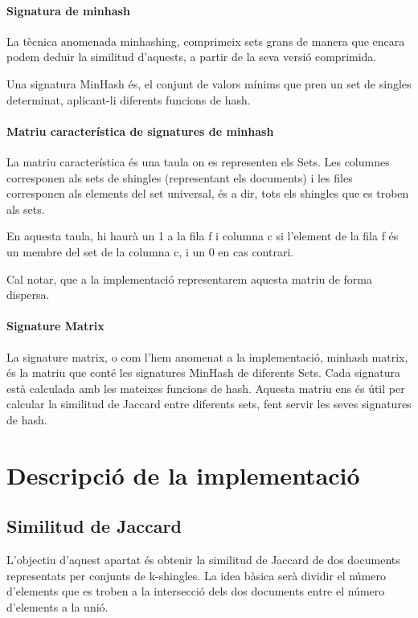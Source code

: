 \documentclass[a4paper, titlepage, 12pt]{report}
\begin{document}
\subsubsection{Signatura de minhash}
La tècnica anomenada minhashing, comprimeix sets grans de manera que encara podem deduir la similitud d’aquests, a partir de la seva versió comprimida.

Una signatura MinHash és, el conjunt de valors mínims que pren un set de singles determinat, aplicant-li diferents funcions de hash.

\subsubsection{Matriu característica de signatures de minhash}
La matriu característica és una taula on es representen els Sets. Les columnes corresponen als sets de shingles (representant els documents) i les files corresponen als elements del set universal, és a dir, tots els shingles que es troben als sets.

En aquesta taula, hi haurà un 1 a la fila f i columna c si l’element de la fila f és un membre del set de la columna c, i un 0 en cas contrari.

Cal notar, que a la implementació representarem aquesta matriu de forma dispersa.

\subsubsection{Signature Matrix}
La signature matrix, o com l’hem anomenat a la implementació, minhash matrix, és la matriu que conté les signatures MinHash de diferents Sets. Cada signatura està calculada amb les mateixes funcions de hash. Aquesta matriu ens és útil per calcular la similitud de Jaccard entre diferents sets, fent servir les seves signatures de hash.




\chapter{Descripció de la implementació}
\section{Similitud de Jaccard}
L’objectiu d’aquest apartat és obtenir la similitud de Jaccard de dos documents representats per conjunts de k-shingles. La idea bàsica serà dividir el número d’elements que es troben a la intersecció dels dos documents entre el número d’elements a la unió.
\end{document}
